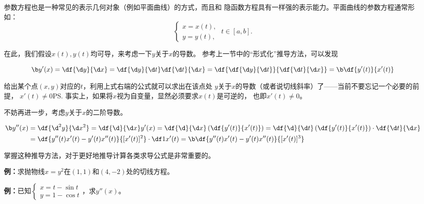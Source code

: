 参数方程也是一种常见的表示几何对象（例如平面曲线）的方式，而且和
隐函数方程具有一样强的表示能力。平面曲线的参数方程通常形如：
$$
	\left\{\begin{array}{l}
		x=x(t),\\
		y=y(t),
	\end{array}\right.\;t\in [a,b].
$$

在此，我们假设$x(t),y(t)$均可导，来考虑一下$y$关于$x$的导数。
参考上一节中的“形式化”推导方法，可以发现
\begin{thx}
	$${\b y'(x)}=\df{\d y}{\d x}=\df{\d y}{\d t}\df{\d t}{\d x}
	=\df{\df{\d y}{\d t}}{\df{\d t}{\d x}}={\b \df{y'(t)}{x'(t)}}$$
\end{thx}
给出某个点$(x,y)$对应的$t$，利用上式右端的公式就可以求出在该点处
$y$关于$x$的导数（或者说切线斜率）了——当前不要忘记一个必要的前提，
$x'(t)\ne 0$\ps{事实上，如果将$x$视为自变量，显然必须要求$x(t)$是可逆的，
也即$x'(t)\ne 0$}。

不妨再进一步，考虑$y$关于$x$的二阶导数。
\begin{thx}
	\begin{align*}
		{\b y''(x)}&=\df{\d^2y}{\d x^2}=\df{\d}{\d x}y'(x)
		=\df{\d}{\d x}\left(\df{y'(t)}{x'(t)}\right)
		=\df{\d}{\d t}\left(\df{y'(t)}{x'(t)}\right)\cdot\df{\d t}{\d x}\\
		&=\df{y''(t)x'(t)-y'(t)x''(t)}{[x'(t)]^2}\cdot\df1{x'(t)}
		={\b \df{y''(t)x'(t)-y'(t)x''(t)}{[x'(t)]^3}}
	\end{align*}
\end{thx}

掌握这种推导方法，对于更好地推导计算各类求导公式是非常重要的。

{\bf 例：}求抛物线$x=y^2$在$(1,1)$和$(4,-2)$处的切线方程。

{\bf 例：}已知$\left\{\begin{array}{l}x=t-\sin t\\
y=1-\cos t\end{array}\right.$，求$y''(x)$。
\begin{center}
\end{center}

